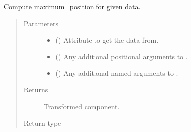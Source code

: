 \documentclass[letterpaper,10pt,english]{sphinxmanual}
\begin{document}
\begin{fulllineitems}
\begin{fulllineitems}
\label{\detokenize{api/base_classes:geology.src.base_spatial.SpatialComponent.maximum_position}}
Compute maximum\_position for given data.
\begin{quote}\begin{description}
\item[{Parameters}] \leavevmode\begin{itemize}
\item {} 
 (\sphinxstyleliteralemphasis{\sphinxupquote{, }}) \textendash{} Attribute to get the data from.

\item {} 
 () \textendash{} Any additional positional arguments to .

\item {} 
 () \textendash{} Any additional named arguments to .

\end{itemize}

\item[{Returns}] \leavevmode
{} \textendash{} Transformed component.

\item[{Return type}] \leavevmode
{\hyperref[\detokenize{api/base_classes:geology.src.base_spatial.SpatialComponent}]{}}

\end{description}\end{quote}

\end{fulllineitems}



\end{fulllineitems}
\end{document}
